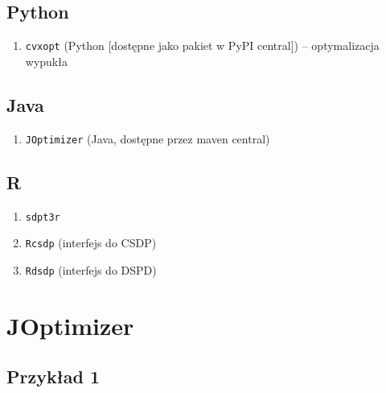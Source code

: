 \documentclass{beamer}
\begin{document}
\subsection{Python}

\begin{frame}[fragile]
    \begin{enumerate}
        \item \verb+cvxopt+ (Python [dostępne jako pakiet w PyPI central]) -- optymalizacja wypukła
    \end{enumerate}
\end{frame}

\subsection{Java}

\begin{frame}[fragile]
    \begin{enumerate}
        \item \verb+JOptimizer+ (Java, dostępne przez maven central)
    \end{enumerate}
\end{frame}

\subsection{R}

\begin{frame}[fragile]
    \begin{enumerate}
        \item \verb+sdpt3r+
        \item \verb+Rcsdp+ (interfejs do CSDP)
        \item \verb+Rdsdp+ (interfejs do DSPD)
    \end{enumerate}
\end{frame}

\section{JOptimizer}

\subsection{Przykład 1}
\end{document}
